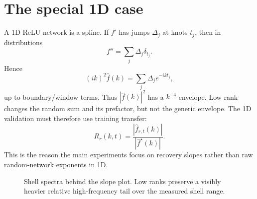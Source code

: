 \documentclass[10pt]{article}
\newcommand{\wh}{\widehat}
\begin{document}
\section{The special 1D case}
A 1D ReLU network is a spline.  If $f'$ has jumps $\Delta_j$ at knots $t_j$, then in distributions
\begin{equation}
f''=\sum_j\Delta_j\delta_{t_j}.
\end{equation}
Hence
\begin{equation}
(ik)^2\wh f(k)=\sum_j\Delta_j e^{-ikt_j},
\end{equation}
up to boundary/window terms.  Thus $|\wh f(k)|^2$ has a $k^{-4}$ envelope.  Low rank changes the random sum and its prefactor, but not the generic envelope.  The 1D validation must therefore use training transfer:
\begin{equation}
R_r(k,t)=\frac{|\wh f_{r,t}(k)|}{|\wh f^\star(k)|}.
\end{equation}
This is the reason the main experiments focus on recovery slopes rather than raw random-network exponents in 1D.

\begin{figure}[t]
\centering
{}
\caption{Shell spectra behind the slope plot.  Low ranks preserve a visibly heavier relative high-frequency tail over the measured shell range.}
\label{fig:app_cpwl_spectra}
\end{figure}
\end{document}
